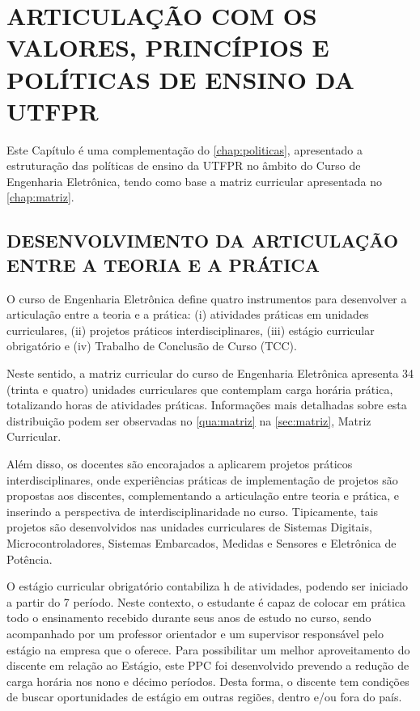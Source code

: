 \chapter{ARTICULAÇÃO COM OS VALORES, PRINCÍPIOS E POLÍTICAS DE ENSINO DA UTFPR}

Este Capítulo é uma complementação do \autoref{chap:politicas}, apresentado a estruturação das políticas de ensino da UTFPR no âmbito do Curso de Engenharia Eletrônica, tendo como base a matriz curricular apresentada no \autoref{chap:matriz}.

\section{DESENVOLVIMENTO DA ARTICULAÇÃO ENTRE A TEORIA E A PRÁTICA}

O curso de Engenharia Eletrônica define quatro instrumentos para desenvolver a articulação entre a teoria e a prática: (i) atividades práticas em unidades curriculares, (ii) projetos práticos interdisciplinares, (iii) estágio curricular obrigatório e (iv) Trabalho de Conclusão de Curso (TCC).

Neste sentido, a matriz curricular do curso de Engenharia Eletrônica apresenta 34 (trinta e quatro) unidades curriculares que contemplam carga horária prática, totalizando \the\value{horasAP} horas de atividades práticas. Informações mais detalhadas sobre esta distribuição podem ser observadas no \autoref{qua:matriz} na \autoref{sec:matriz}, Matriz Curricular.

Além disso, os docentes são encorajados a aplicarem projetos práticos interdisciplinares, onde experiências práticas de implementação de projetos são propostas aos discentes, complementando a articulação entre teoria e prática, e inserindo a perspectiva de interdisciplinaridade no curso. Tipicamente, tais projetos são desenvolvidos nas unidades curriculares de Sistemas Digitais, Microcontroladores, Sistemas Embarcados, Medidas e Sensores e Eletrônica de Potência.

O estágio curricular obrigatório contabiliza  h de atividades, podendo ser iniciado a partir do 7\textordmasculine{} período. Neste contexto, o estudante é capaz de colocar em prática todo o ensinamento recebido durante seus anos de estudo no curso, sendo acompanhado por um professor orientador e um supervisor responsável pelo estágio na empresa que o oferece. Para possibilitar um melhor aproveitamento do discente em relação ao Estágio, este PPC foi desenvolvido prevendo a redução de carga horária nos nono e décimo períodos. Desta forma, o discente tem condições de buscar oportunidades de estágio em outras regiões, dentro e/ou fora do país.

